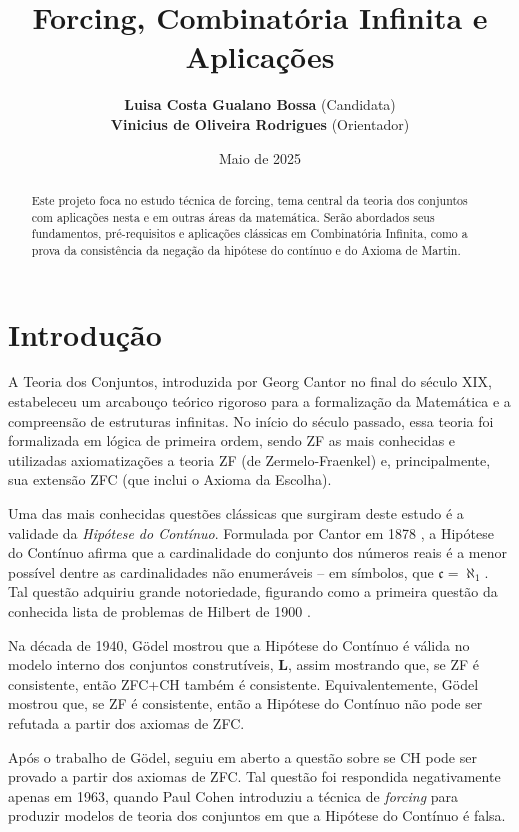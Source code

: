 \documentclass{article}
\author{
   \textbf{Luisa Costa Gualano Bossa} (Candidata)\\
    \textbf{Vinicius de Oliveira Rodrigues} (Orientador)\\
}
\title{\textbf{Forcing, Combinatória Infinita e Aplicações}}
\date{Maio de 2025}
\begin{document}
\maketitle
\begin{abstract}
    Este projeto foca no estudo técnica de forcing, tema central da teoria dos conjuntos com aplicações nesta e em outras áreas da matemática. Serão abordados seus fundamentos, pré-requisitos e aplicações clássicas em Combinatória Infinita, como a prova da consistência da negação da hipótese do contínuo e do Axioma de Martin.
\end{abstract}



\section{Introdução}
    A Teoria dos Conjuntos, introduzida por Georg Cantor no final do século XIX, estabeleceu um arcabouço teórico rigoroso para a formalização da Matemática e a compreensão de estruturas infinitas. No início do século passado, essa teoria foi formalizada em lógica de primeira ordem, sendo ZF as mais conhecidas e utilizadas axiomatizações a teoria ZF (de Zermelo-Fraenkel) e, principalmente, sua extensão ZFC (que inclui o Axioma da Escolha).

    Uma das mais conhecidas questões clássicas que surgiram deste estudo é a validade da \emph{Hipótese do Contínuo}.
    Formulada por Cantor em 1878 \cite{cantor1878beitrag}, a Hipótese do Contínuo afirma que a cardinalidade do conjunto dos números reais é a menor possível dentre as cardinalidades não enumeráveis -- em símbolos, que $\mathfrak c=\aleph_1$.
    Tal questão adquiriu grande notoriedade, figurando como a primeira questão da conhecida lista de problemas de Hilbert de 1900 \cite{hilbert1900mathematische}.

    Na década de 1940, Gödel mostrou que a Hipótese do Contínuo é válida no modelo interno dos conjuntos construtíveis, $\mathbf{L}$, assim mostrando que, se ZF é consistente, então ZFC+CH também é consistente.
    Equivalentemente, Gödel mostrou que, se ZF é consistente, então a Hipótese do Contínuo não pode ser refutada a partir dos axiomas de ZFC.
    
    Após o trabalho de Gödel, seguiu em aberto a questão sobre se CH pode ser provado a partir dos axiomas de ZFC.
    Tal questão foi respondida negativamente apenas em 1963, quando Paul Cohen \cite{cohen1963independence} introduziu a técnica de \emph{forcing} para produzir modelos de teoria dos conjuntos em que a Hipótese do Contínuo é falsa.
\end{document}
